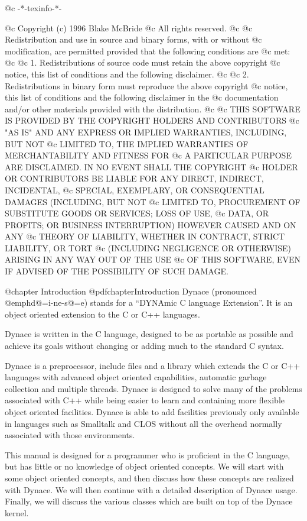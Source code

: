 @c -*-texinfo-*-

@c  Copyright (c) 1996 Blake McBride
@c  All rights reserved.
@c
@c  Redistribution and use in source and binary forms, with or without
@c  modification, are permitted provided that the following conditions are
@c  met:
@c
@c  1. Redistributions of source code must retain the above copyright
@c  notice, this list of conditions and the following disclaimer.
@c
@c  2. Redistributions in binary form must reproduce the above copyright
@c  notice, this list of conditions and the following disclaimer in the
@c  documentation and/or other materials provided with the distribution.
@c
@c  THIS SOFTWARE IS PROVIDED BY THE COPYRIGHT HOLDERS AND CONTRIBUTORS
@c  "AS IS" AND ANY EXPRESS OR IMPLIED WARRANTIES, INCLUDING, BUT NOT
@c  LIMITED TO, THE IMPLIED WARRANTIES OF MERCHANTABILITY AND FITNESS FOR
@c  A PARTICULAR PURPOSE ARE DISCLAIMED. IN NO EVENT SHALL THE COPYRIGHT
@c  HOLDER OR CONTRIBUTORS BE LIABLE FOR ANY DIRECT, INDIRECT, INCIDENTAL,
@c  SPECIAL, EXEMPLARY, OR CONSEQUENTIAL DAMAGES (INCLUDING, BUT NOT
@c  LIMITED TO, PROCUREMENT OF SUBSTITUTE GOODS OR SERVICES; LOSS OF USE,
@c  DATA, OR PROFITS; OR BUSINESS INTERRUPTION) HOWEVER CAUSED AND ON ANY
@c  THEORY OF LIABILITY, WHETHER IN CONTRACT, STRICT LIABILITY, OR TORT
@c  (INCLUDING NEGLIGENCE OR OTHERWISE) ARISING IN ANY WAY OUT OF THE USE
@c  OF THIS SOFTWARE, EVEN IF ADVISED OF THE POSSIBILITY OF SUCH DAMAGE.


@chapter Introduction
@pdfchapter{Introduction}
Dynace (pronounced @emph{d@=i-ne-s@=e}) stands for a ``DYNAmic C
language Extension''.  It is an object oriented extension to the C or
C++ languages.

Dynace is written in the C language, designed to be as portable as
possible and achieve its goals without changing or adding much to the
standard C syntax.

Dynace is a preprocessor, include files and a library which extends the
C or C++ languages with advanced object oriented capabilities, automatic
garbage collection and multiple threads.  Dynace is designed to solve
many of the problems associated with C++ while being easier to learn and
containing more flexible object oriented facilities.  Dynace is able to
add facilities previously only available in languages such as Smalltalk
and CLOS without all the overhead normally associated with those
environments.

This manual is designed for a programmer who is proficient in the C language,
but has little or no knowledge of object oriented concepts.  We will start
with some object oriented concepts, and then discuss how these concepts
are realized with Dynace.  We will then continue with a detailed description of
Dynace usage.  Finally, we will discuss the various classes which are built
on top of the Dynace kernel.


